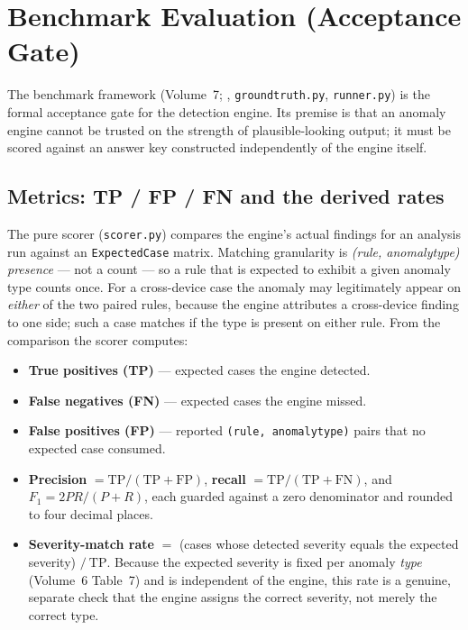\documentclass[12pt,a4paper]{report}
\renewcommand{\_}{\textunderscore\allowbreak}
\begin{document}
\section{Benchmark Evaluation (Acceptance Gate)}
\label{sec:ch4-benchmark}

The benchmark framework (Volume~7; , \texttt{ground\_truth.py}, \texttt{runner.py}) is the formal acceptance gate for the detection engine. Its premise is that an anomaly engine cannot be trusted on the strength of plausible-looking output; it must be scored against an answer key constructed independently of the engine itself.

\subsection{Metrics: TP / FP / FN and the derived rates}

The pure scorer (\texttt{scorer.py}) compares the engine's actual findings for an analysis run against an \texttt{ExpectedCase} matrix. Matching granularity is \emph{(rule, anomaly\_type) presence} --- not a count --- so a rule that is expected to exhibit a given anomaly type counts once. For a cross-device case the anomaly may legitimately appear on \emph{either} of the two paired rules, because the engine attributes a cross-device finding to one side; such a case matches if the type is present on either rule. From the comparison the scorer computes:

\begin{itemize}[leftmargin=1.4em]
  \item \textbf{True positives (TP)} --- expected cases the engine detected.
  \item \textbf{False negatives (FN)} --- expected cases the engine missed.
  \item \textbf{False positives (FP)} --- reported \texttt{(rule, anomaly\_type)} pairs that no expected case consumed.
  \item \textbf{Precision} $= \mathrm{TP}/(\mathrm{TP}+\mathrm{FP})$, \textbf{recall} $= \mathrm{TP}/(\mathrm{TP}+\mathrm{FN})$, and $F_1 = 2PR/(P+R)$, each guarded against a zero denominator and rounded to four decimal places.
  \item \textbf{Severity-match rate} $=$ (cases whose detected severity equals the expected severity) $/\ \mathrm{TP}$. Because the expected severity is fixed per anomaly \emph{type} (Volume~6 Table~7) and is independent of the engine, this rate is a genuine, separate check that the engine assigns the correct severity, not merely the correct type.
\end{itemize}
\end{document}
